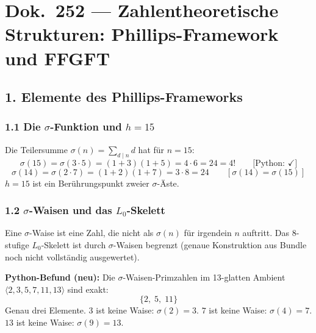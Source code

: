 \section*{Dok.\ 252 — Zahlentheoretische Strukturen: Phillips-Framework und FFGFT}

\begin{abstract}
Paul Phillips hat im Rahmen der IPI-Gruppe ein zahlentheoretisches Framework
eingereicht, das strukturelle Eigenschaften der $\sigma$-Funktion (Teilersumme),
Homologie und dimensionale Dynamik verbindet (23 Dateien, SHA-256 gepinnt).
Dieses Dokument ist eine erste systematische Gegenüberstellung mit FFGFT.
Alle Kernaussagen wurden Python-verifiziert. Das Bundle ist noch nicht
vollständig ausgewertet; offene Punkte werden explizit benannt.
Der neue Zentralbefund: die $\sigma$-Waisen-Primzahlen im 13-glatten Ambient
sind exakt $\{2, 5, 11\}$ — und $5$, $11$ sind genau die mittleren Terme
der kubischen Folge $3 \to 5 \to 11 \to 1321$.
\end{abstract}

\subsection*{1. Elemente des Phillips-Frameworks}

\subsubsection*{1.1 Die $\sigma$-Funktion und $h = 15$}

Die Teilersumme $\sigma(n) = \sum_{d \mid n} d$ hat für $n = 15$:
\[
\sigma(15) = \sigma(3 \cdot 5) = (1+3)(1+5) = 4 \cdot 6 = 24 = 4!
\qquad \text{[Python: } \checkmark\text{]}
\]
\[
\sigma(14) = \sigma(2 \cdot 7) = (1+2)(1+7) = 3 \cdot 8 = 24
\qquad [\sigma(14) = \sigma(15)]
\]
$h = 15$ ist ein Berührungspunkt zweier $\sigma$-Äste.

\subsubsection*{1.2 $\sigma$-Waisen und das $L_0$-Skelett}

Eine $\sigma$-Waise ist eine Zahl, die nicht als $\sigma(n)$ für irgendein $n$ auftritt.
Das 8-stufige $L_0$-Skelett ist durch $\sigma$-Waisen begrenzt
(genaue Konstruktion aus Bundle noch nicht vollständig ausgewertet).

\begin{mdframed}[style=ok]
\textbf{Python-Befund (neu):} Die $\sigma$-Waisen-Primzahlen im 13-glatten
Ambient $\langle 2, 3, 5, 7, 11, 13 \rangle$ sind exakt:
\[
\boxed{\{2,\; 5,\; 11\}}
\]
Genau drei Elemente. $3$ ist keine Waise: $\sigma(2) = 3$.
$7$ ist keine Waise: $\sigma(4) = 7$. $13$ ist keine Waise: $\sigma(9) = 13$.
\end{mdframed}

